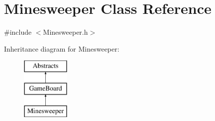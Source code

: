 \hypertarget{class_minesweeper}{}\section{Minesweeper Class Reference}
\label{class_minesweeper}


{\ttfamily \#include $<$Minesweeper.\+h$>$}

Inheritance diagram for Minesweeper\+:\begin{figure}[H]
\begin{center}
\leavevmode
\includegraphics[height=3.000000cm]{class_minesweeper}
\end{center}
\end{figure}
